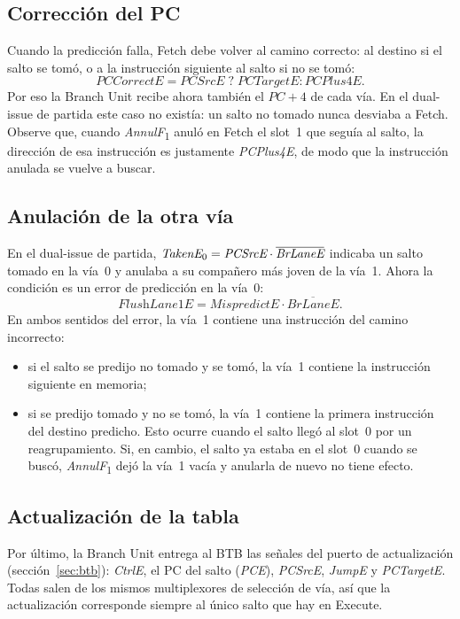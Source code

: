 \documentclass[11pt,a4paper]{article}
\newcommand{\sig}[1]{\textit{#1}}
\newcommand{\sigk}[2]{\textit{#1}\textsubscript{#2}}
\begin{document}
\subsection{Corrección del PC}

Cuando la predicción falla, Fetch debe volver al camino correcto: al destino si el salto se
tomó, o a la instrucción siguiente al salto si no se tomó:
\[
  \sig{PCCorrectE} = \sig{PCSrcE}\;?\;\sig{PCTargetE} : \sig{PCPlus4E}.
\]
Por eso la Branch Unit recibe ahora también el $\sig{PC}+4$ de cada vía. En el dual-issue
de partida este caso no existía: un salto no tomado nunca desviaba a Fetch. Observe que,
cuando \sigk{AnnulF}{1} anuló en Fetch el slot~1 que seguía al salto, la dirección de esa
instrucción es justamente \sig{PCPlus4E}, de modo que la instrucción anulada se vuelve a
buscar.

\subsection{Anulación de la otra vía}

En el dual-issue de partida, $\sigk{TakenE}{0} = \sig{PCSrcE}\cdot\overline{\sig{BrLaneE}}$ indicaba un salto tomado en la vía~0 y anulaba
a su compañero más joven de la vía~1. Ahora la condición es un error de predicción en la
vía~0:
\[
  \sig{FlushLane1E} = \sig{MispredictE}\cdot\overline{\sig{BrLaneE}}.
\]
En ambos sentidos del error, la vía~1 contiene una instrucción del camino incorrecto:
\begin{itemize}
  \item si el salto se predijo no tomado y se tomó, la vía~1 contiene la instrucción
        siguiente en memoria;
  \item si se predijo tomado y no se tomó, la vía~1 contiene la primera instrucción del
        destino predicho. Esto ocurre cuando el salto llegó al slot~0 por un
        reagrupamiento. Si, en cambio, el salto ya estaba en el slot~0 cuando se buscó,
        \sigk{AnnulF}{1} dejó la vía~1 vacía y anularla de nuevo no tiene efecto.
\end{itemize}

\subsection{Actualización de la tabla}

Por último, la Branch Unit entrega al BTB las señales del puerto de actualización
(sección~\ref{sec:btb}): \sig{CtrlE}, el PC del salto (\sig{PCE}), \sig{PCSrcE},
\sig{JumpE} y \sig{PCTargetE}. Todas salen de los mismos multiplexores de selección de
vía, así que la actualización corresponde siempre al único salto que hay en Execute.
\end{document}
